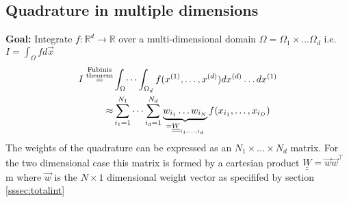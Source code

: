 \subsection{Quadrature in multiple dimensions}
    \textbf{Goal:} Integrate $f:\mathbb{R}^d\to\mathbb{R}$ over a multi-dimensional domain $\Omega = \Omega_1\times\dots\Omega_d$ i.e. $ I = \int_\Omega fd\vec{x}$
    \begin{align*}
         I \overset{\substack{\textnormal{Fubinis}\\\textnormal{theorem}}}{=}&\int_{\Omega}\dots\int_{\Omega_d}f(x^{(1)},\dots,x^{(d)})dx^{(d)}\dots dx^{(1)}\\
         \approx &\sum_{i_1=1}^{N_1}\dots\sum_{i_d=1}^{N_d} \underbrace{w_{i_1}\dots w_{i_N}}_{= \underline{\underline{W}}_{i_1,\dots,i_d}} f(x_{i_1},\dots, x_{i_D})
    \end{align*}
    The weights of the quadrature can be expressed as an $N_1\times\dots\times N_d$  matrix. For the two dimensional case this matrix is formed by a cartesian product $\underline{\underline{W}} = \Vec{w}\Vec{w}^\top$m where $\Vec{w}$ is the $N\times 1$ dimensional weight vector as specififed by section \ref{sssec:totalint}
    